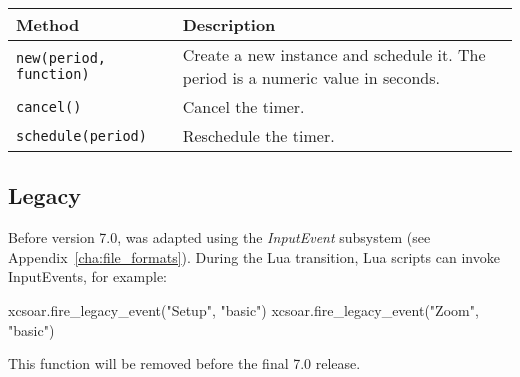 \begin{maxipage}
\begin{tabularx}{1.9\textwidth}{l|X}
Method & Description \\
\hline\hline

\verb|new(period, function)| & Create a new instance and schedule
it.  The period is a numeric value in seconds. \\

\hline

\verb|cancel()| & Cancel the timer. \\

\hline

\verb|schedule(period)| & Reschedule the timer. \\

\end{tabularx}
\end{maxipage}

\subsection{Legacy}

Before version 7.0, \xc was adapted using the \emph{InputEvent}
subsystem (see Appendix~\ref{cha:file_formats}).  During the Lua
transition, Lua scripts can invoke InputEvents, for example:

\begin{lua}
xcsoar.fire_legacy_event("Setup", "basic")
xcsoar.fire_legacy_event("Zoom", "basic")
\end{lua}

This function will be removed before the final 7.0 release.
